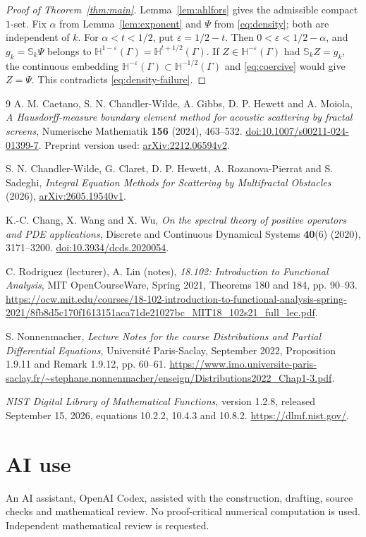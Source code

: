 \documentclass[11pt]{article}
\newcommand{\hH}{\mathbb H}
\begin{document}
\begin{proof}[Proof of Theorem~\ref{thm:main}]
Lemma~\ref{lem:ahlfors} gives the admissible compact \(1\)-set.
Fix \(\alpha\) from Lemma~\ref{lem:exponent} and \(\Psi\) from
\eqref{eq:density}; both are independent of \(k\).
For \(\alpha<t<1/2\), put \(\varepsilon=1/2-t\).
Then \(0<\varepsilon<1/2-\alpha\), and
\(g_k=\mathbb S_k\Psi\) belongs to
\(\hH^{1-\varepsilon}(\Gamma)=\hH^{t+1/2}(\Gamma)\).
If \(Z\in\hH^{-\varepsilon}(\Gamma)\) had \(\mathbb S_k Z=g_k\),
the continuous embedding
\(\hH^{-\varepsilon}(\Gamma)\subset\hH^{-1/2}(\Gamma)\) and
\eqref{eq:coercive} would give \(Z=\Psi\).
This contradicts \eqref{eq:density-failure}.
\end{proof}

\begin{thebibliography}{9}
A. M. Caetano, S. N. Chandler-Wilde, A. Gibbs, D. P. Hewett and A. Moiola,
\emph{A Hausdorff-measure boundary element method for acoustic scattering
by fractal screens}, Numerische Mathematik \textbf{156} (2024), 463--532.
\href{https://doi.org/10.1007/s00211-024-01399-7}{doi:10.1007/s00211-024-01399-7}.
Preprint version used: \href{https://arxiv.org/abs/2212.06594v2}{arXiv:2212.06594v2}.

S. N. Chandler-Wilde, G. Claret, D. P. Hewett, A. Rozanova-Pierrat and
S. Sadeghi, \emph{Integral Equation Methods for Scattering by Multifractal
Obstacles} (2026), \href{https://arxiv.org/abs/2605.19540v1}{arXiv:2605.19540v1}.

K.-C. Chang, X. Wang and X. Wu,
\emph{On the spectral theory of positive operators and PDE applications},
Discrete and Continuous Dynamical Systems \textbf{40}(6) (2020), 3171--3200.
\href{https://doi.org/10.3934/dcds.2020054}{doi:10.3934/dcds.2020054}.

C. Rodriguez (lecturer), A. Lin (notes),
\emph{18.102: Introduction to Functional Analysis}, MIT OpenCourseWare,
Spring 2021, Theorems 180 and 184, pp. 90--93.
\url{https://ocw.mit.edu/courses/18-102-introduction-to-functional-analysis-spring-2021/8fb8d5c170f1613151aca71de21027bc_MIT18_102s21_full_lec.pdf}.

S. Nonnenmacher,
\emph{Lecture Notes for the course Distributions and Partial Differential
Equations}, Universit\'e Paris-Saclay, September 2022,
Proposition 1.9.11 and Remark 1.9.12, pp. 60--61.
\url{https://www.imo.universite-paris-saclay.fr/~stephane.nonnenmacher/enseign/Distributions2022_Chap1-3.pdf}.

\emph{NIST Digital Library of Mathematical Functions}, version 1.2.8,
released September 15, 2026, equations 10.2.2, 10.4.3 and 10.8.2.
\url{https://dlmf.nist.gov/}.
\end{thebibliography}

\section*{AI use}
An AI assistant, OpenAI Codex, assisted with the construction, drafting,
source checks and mathematical review. No proof-critical numerical
computation is used. Independent mathematical review is requested.
\end{document}
